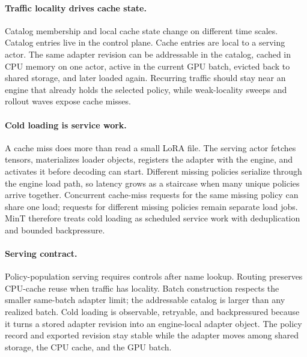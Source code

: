 \documentclass{llmxive}
\begin{document}
\paragraph{Traffic locality drives cache state.}
Catalog membership and local cache state change on different time scales. Catalog entries live in the control plane. Cache entries are local to a serving actor. The same adapter revision can be addressable in the catalog, cached in CPU memory on one actor, active in the current GPU batch, evicted back to shared storage, and later loaded again. Recurring traffic should stay near an engine that already holds the selected policy, while weak-locality sweeps and rollout waves expose cache misses.

\paragraph{Cold loading is service work.}
A cache miss does more than read a small LoRA file. The serving actor fetches tensors, materializes loader objects, registers the adapter with the engine, and activates it before decoding can start. Different missing policies serialize through the engine load path, so latency grows as a staircase when many unique policies arrive together. Concurrent cache-miss requests for the same missing policy can share one load; requests for different missing policies remain separate load jobs. MinT therefore treats cold loading as scheduled service work with deduplication and bounded backpressure.

\paragraph{Serving contract.}
Policy-population serving requires controls after name lookup. Routing preserves CPU-cache reuse when traffic has locality. Batch construction respects the smaller same-batch adapter limit; the addressable catalog is larger than any realized batch. Cold loading is observable, retryable, and backpressured because it turns a stored adapter revision into an engine-local adapter object. The policy record and exported revision stay stable while the adapter moves among shared storage, the CPU cache, and the GPU batch.
\end{document}
